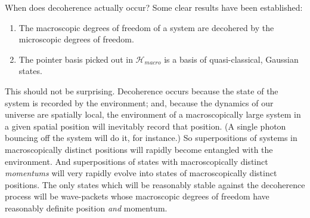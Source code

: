 \documentclass[12pt]{article}
\newcommand{\mc}[1]{\ensuremath{\mathcal{#1}}}
\begin{document}
When does decoherence actually occur? Some clear results have been established:
\begin{enumerate}
\item The macroscopic degrees of freedom of a system are decohered by the microscopic degrees of freedom.
\item The pointer basis picked out in $\mc{H}_{macro}$ is a basis of quasi-classical, Gaussian states.
\end{enumerate}
This should not be surprising. Decoherence occurs because the state of the system is recorded by the environment; and, because the dynamics of our universe are spatially local, the environment of a macroscopically large system in a given spatial position will inevitably record that position. (A single photon bouncing off the system will do it, for instance.)  So superpositions of systems in macroscopically distinct positions will rapidly become entangled with the environment. And superpositions of states with macroscopically distinct \emph{momentums} will very rapidly evolve into states of macroscopically distinct positions. The only states which will be reasonably stable against the decoherence process will be wave-packets whose macroscopic degrees of freedom have reasonably definite position \emph{and} momentum.
\end{document}
